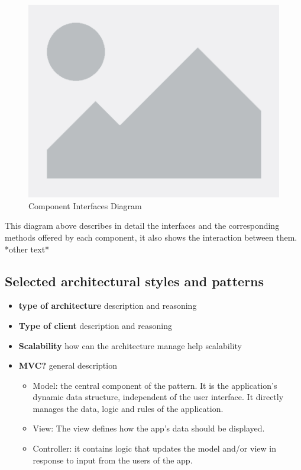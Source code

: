 \documentclass[table, 12pt]{article}
\begin{document}
\begin{center}
    \begin{figure}[H]
        \includegraphics[scale=0.60, center]{assets/placeholder.png}
        \caption{Component Interfaces Diagram}
        \label{fig: component_interfaces}
    \end{figure}
\end{center}

This diagram above describes in detail the interfaces and the corresponding methods offered by each component, it also shows the interaction between them.
*other text*

\subsection{Selected architectural styles and patterns}

    \begin{itemize}
        \item \textbf{type of architecture} \newline
             description and reasoning
        \item \textbf{Type of client} \newline
              description and reasoning
        \item \textbf{Scalability} \newline
              how can the architecture manage help scalability
        \item \textbf{MVC?} \newline
              general description
              \begin{itemize}
                  \item Model: the central component of the pattern. It is the application's dynamic data structure, independent of the user interface. It directly manages the data, logic and rules of the application.
                  \item View: The view defines how the app's data should be displayed.
                  \item Controller: it contains logic that updates the model and/or view in response to input from the users of the app. 
              \end{itemize}
    \end{itemize}
\end{document}
